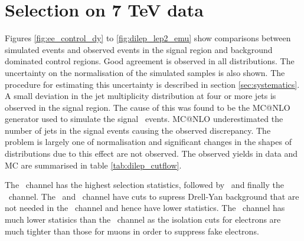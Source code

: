 \section{Selection on 7 TeV data}

Figures \ref{fig:ee_control_dy} to \ref{fig:dilep_lep2_emu} show comparisons between simulated events and observed events in the signal region and background dominated control regions. Good agreement is observed in all distributions. The uncertainty on the normalisation of the simulated samples is also shown. The procedure for estimating this uncertainty is described in section \ref{sec:systematics}. A small deviation in the jet multiplicity distribution at four or more jets is observed in the signal region. The cause of this was found to be the MC@NLO generator used to simulate the signal \ttbar\ events. MC@NLO underestimated the number of jets in the signal events causing the observed discrepancy. The problem is largely one of normalisation and significant changes in the shapes of distributions due to this effect are not observed. The observed yields in data and MC are summarised in table \ref{tab:dilep_cutflow}.

The \emu\ channel has the highest selection statistics, followed by \mumu\ and finally the \ee\ channel. The \ee\ and \mumu\ channel have cuts to supress Drell-Yan background that are not needed in the \emu\ channel and hence have lower statistics. The \ee\ channel has much lower statisics than the \mumu\ channel as the isolation cuts for electrons are much tighter than those for muons in order to suppress fake electrons.


